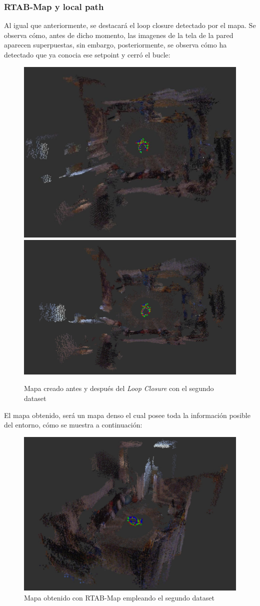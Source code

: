 \subsubsection{RTAB-Map y local path}
Al igual que anteriormente, se destacará el loop closure detectado por el mapa. Se observa cómo, antes de dicho momento, las imagenes de la tela de la pared aparecen superpuestas,
sin embargo, posteriormente, se observa cómo ha detectado que ya conocia ese setpoint y cerró el bucle:
\begin{figure}[h!]
    \centering
    \includegraphics[width=.4\textwidth]{images/slam/bag3_rtabmap_noLC}
    \includegraphics[width=.51\textwidth]{images/slam/bag3_rtabmap_LC}
    \caption{Mapa creado antes y después del \textit{Loop Closure} con el segundo dataset}
\end{figure}

El mapa obtenido, será un mapa denso el cual posee toda la información posible del entorno, cómo se muestra a continuación:

\begin{figure}[h!]
    \centering
    \includegraphics[width=.7\textwidth]{images/slam/bag3_rtabmapbonito}
    \caption{Mapa obtenido con RTAB-Map empleando el segundo dataset}
\end{figure}
    

